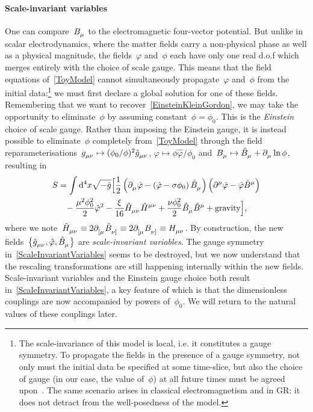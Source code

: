 \documentclass[aps,prd,reprint,preprintnumbers,showpacs,floatfix,nofootinbib,superscript address]{revtex4-2}
\begin{document}
\paragraph*{Scale-invariant variables} One can compare~$\FieldV{_\mu}$ to the electromagnetic four-vector potential. But unlike in scalar electrodynamics, where the matter fields carry a non-physical phase as well as a physical magnitude, the fields~$\varphi$ and~$\phi$ each have only one real d.o.f which merges entirely with the choice of scale gauge. This means that the field equations of~\cref{ToyModel} cannot simultaneously propagate~$\varphi$ and~$\phi$ from the initial data:\footnote{The scale-invariance of this model is local, i.e. it constitutes a gauge symmetry. To propagate the fields in the presence of a gauge symmetry, not only must the initial data be specified at some time-slice, but also the choice of gauge (in our case, the value of~$\phi$) at all future times must be agreed upon~\cite{Henneaux:1992ig}. The same scenario arises in classical electromagnetism and in GR: it does not detract from the well-posedness of the model.} we must first declare a global solution for one of these fields. Remembering that we want to recover~\cref{EinsteinKleinGordon}, we may take the opportunity to eliminate~$\phi$ by assuming constant~$\phi=\phi_0$. This is the \emph{Einstein} choice of scale gauge. Rather than imposing the Einstein gauge, it is instead possible to eliminate~$\phi$ completely from~\cref{ToyModel} through the field reparameterisations~$\FieldG{_{\mu\nu}}\mapsto(\phi_0/\phi)^2\FieldGHat{_{\mu\nu}}$, $\varphi\mapsto\phi\hat\varphi/\phi_0$ and~$\FieldV{_\mu}\mapsto\FieldVHat{_\mu}+\PD{_\mu}\ln\phi$, resulting in
\begin{align}\label{ScaleInvariantVariables}
	S=\int\mathrm{d}^4x\sqrt{-\hat g}\Big[&\frac{1}{2}\left(\PD{_\mu}\hat\varphi-\left(\hat\varphi-\sigma\phi_0\right)\FieldVHat{_\mu}\right)\left(\PD{^\mu}\hat\varphi-\hat\varphi\FieldVHat{^\mu}\right)
		\nonumber\\&
		\hspace{-60pt}
		-\frac{\mu^2\phi_0^2}{2}\hat\varphi^2
		-\frac{\xi}{16}\MAGHHat{_{\mu\nu}}\MAGHHat{^{\mu\nu}}
		+\frac{\nu\phi_0^2}{2}\FieldVHat{_\mu}\FieldVHat{^\mu}
		+\text{gravity}\Big],
\end{align}
where we note~$\MAGHHat{_{\mu\nu}} \equiv 2\PD{_{[\mu}}\FieldVHat{_{\nu]}}\equiv 2\PD{_{[\mu}}\FieldV{_{\nu]}}\equiv \MAGH{_{\mu\nu}}$. By construction, the new fields~$\big\{\FieldGHat{_{\mu\nu}},\hat\varphi,\FieldVHat{_\mu}\big\}$ are \emph{scale-invariant variables}. The gauge symmetry in~\cref{ScaleInvariantVariables} seems to be destroyed, but we now understand that the rescaling transformations are still happening internally within the new fields. Scale-invariant variables and the Einstein gauge choice both result in~\cref{ScaleInvariantVariables}, a key feature of which is that the dimensionless couplings are now accompanied by powers of~$\phi_0$. We will return to the natural values of these couplings later.
\end{document}
